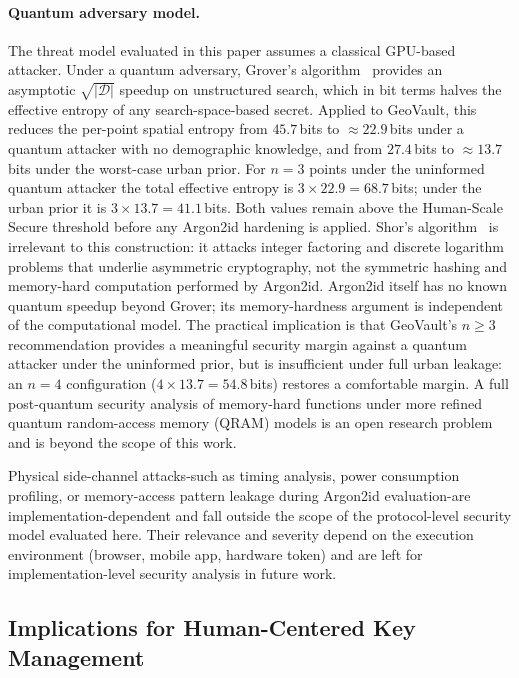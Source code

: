 \documentclass[journal,article,submit,pdftex,moreauthors]{Definitions/mdpi}
\newcommand{\add}[1]{#1}
\newcommand{\add}[1]{\added{#1}}
\begin{document}
\paragraph{Quantum adversary model.}
\add{The threat model evaluated in this paper assumes a classical GPU-based attacker. Under a quantum adversary, Grover's algorithm~\cite{Grover1996} provides an asymptotic $\sqrt{|\mathcal{D}|}$ speedup on unstructured search, which in bit terms halves the effective entropy of any search-space-based secret. Applied to GeoVault, this reduces the per-point spatial entropy from $45.7$\,bits to $\approx 22.9$\,bits under a quantum attacker with no demographic knowledge, and from $27.4$\,bits to $\approx 13.7$\,bits under the worst-case urban prior. For $n=3$ points under the uninformed quantum attacker the total effective entropy is $3 \times 22.9 = 68.7$\,bits; under the urban prior it is $3 \times 13.7 = 41.1$\,bits. Both values remain above the Human-Scale Secure threshold before any Argon2id hardening is applied. Shor's algorithm~\cite{Shor1994} is irrelevant to this construction: it attacks integer factoring and discrete logarithm problems that underlie asymmetric cryptography, not the symmetric hashing and memory-hard computation performed by Argon2id. Argon2id itself has no known quantum speedup beyond Grover; its memory-hardness argument is independent of the computational model. The practical implication is that GeoVault's $n \geq 3$ recommendation provides a meaningful security margin against a quantum attacker under the uninformed prior, but is insufficient under full urban leakage: an $n=4$ configuration ($4 \times 13.7 = 54.8$\,bits) restores a comfortable margin. A full post-quantum security analysis of memory-hard functions under more refined quantum random-access memory (QRAM) models is an open research problem and is beyond the scope of this work.}

\add{Physical side-channel attacks-such as timing analysis, power consumption profiling, or memory-access pattern leakage during Argon2id evaluation-are implementation-dependent and fall outside the scope of the protocol-level security model evaluated here. Their relevance and severity depend on the execution environment (browser, mobile app, hardware token) and are left for implementation-level security analysis in future work.}

\subsection{Implications for Human-Centered Key Management}
\end{document}
